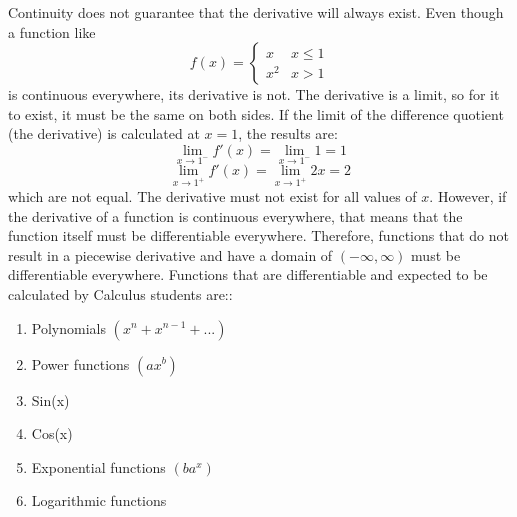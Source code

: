 \documentclass[../revisedmain.tex]{subfiles}
\begin{document}
	Continuity does not guarantee that the derivative will always exist. Even though a function like
	\[
	f(x)=
	\begin{cases}
	x & x\leq 1\\
	x^2 & x>1 
	\end{cases}
	\]
	is continuous everywhere, its derivative is not. The derivative is a limit, so for it to exist, it must be the same on both sides. If the limit of the difference quotient (the derivative) is calculated at $x=1$, the results are:
	$$\lim_{x\to 1^-} f'(x) = \lim_{x\to 1^-} 1 = 1$$
	$$\lim_{x\to 1^+} f'(x)= \lim_{x\to 1^+} 2x = 2$$
	which are not equal. The derivative must not exist for all values of $x$. However, if the derivative of a function is continuous everywhere, that means that the function itself must be differentiable everywhere. Therefore, functions that do not result in a piecewise derivative and have a domain of $(-\infty,\infty)$ must be differentiable everywhere. Functions that are differentiable and expected to be calculated by Calculus students are::
	\begin{enumerate}
		\item Polynomials $(x^n+x^{n-1}+...)$
		\item Power functions $(ax^b)$
		\item Sin(x)
		\item Cos(x)
		\item Exponential functions $(ba^x)$
		\item Logarithmic functions
		\end{enumerate}
\end{document}
